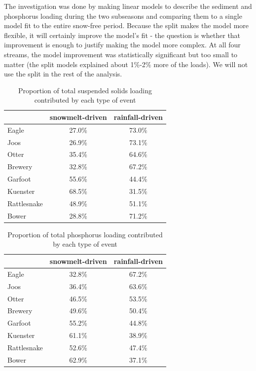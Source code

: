 \documentclass[10pt]{article}
\begin{document}
The investigation was done by making linear models to describe the sediment and phosphorus loading during the two subseasons and comparing them to a single model fit to the entire snow-free period. Because the split makes the model more flexible, it will certainly improve the model's fit - the question is whether that improvement is enough to justify making the model more complex. At all four streams, the model improvement was statistically significant but too small to matter (the split models explained about 1\%-2\% more of the loads). We will not use the split in the rest of the analysis.\\

\begin{table}[ht]
\begin{center}
\begin{tabular}{lcc}
  & snowmelt-driven & rainfall-driven \\ 
  \hline
Eagle & 27.0\% & 73.0\% \\ 
  Joos & 26.9\% & 73.1\% \\ 
  Otter & 35.4\% & 64.6\% \\ 
  Brewery & 32.8\% & 67.2\% \\ 
  Garfoot & 55.6\% & 44.4\% \\ 
  Kuenster & 68.5\% & 31.5\% \\ 
  Rattlesnake & 48.9\% & 51.1\% \\ 
  Bower & 28.8\% & 71.2\% \\ 
  \end{tabular}
\caption{Proportion of total suspended solids loading contributed by each type of event}
\label{tab:stot}
\end{center}
\end{table}
\begin{table}[ht]
\begin{center}
\begin{tabular}{lcc}
  & snowmelt-driven & rainfall-driven \\ 
  \hline
Eagle & 32.8\% & 67.2\% \\ 
  Joos & 36.4\% & 63.6\% \\ 
  Otter & 46.5\% & 53.5\% \\ 
  Brewery & 49.6\% & 50.4\% \\ 
  Garfoot & 55.2\% & 44.8\% \\ 
  Kuenster & 61.1\% & 38.9\% \\ 
  Rattlesnake & 52.6\% & 47.4\% \\ 
  Bower & 62.9\% & 37.1\% \\ 
  \end{tabular}
\caption{Proportion of total phosphorus loading contributed by each type of event}
\label{tab:ptot}
\end{center}
\end{table}
\end{document}
